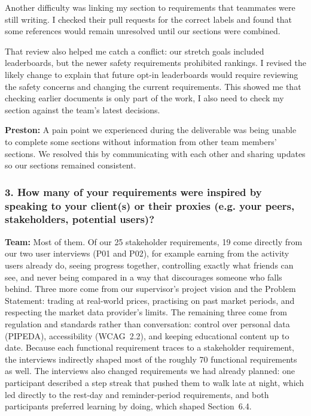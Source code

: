 \documentclass[12pt]{article}
\begin{document}
Another difficulty was linking my section to requirements that teammates were still writing. I checked their pull requests for the correct labels and found that some references would remain unresolved until our sections were combined.

That review also helped me catch a conflict: our stretch goals included leaderboards, but the newer safety requirements prohibited rankings. I revised the likely change to explain that future opt-in leaderboards would require reviewing the safety concerns and changing the current requirements. This showed me that checking earlier documents is only part of the work, I also need to check my section against the team's latest decisions.

\bigskip
\noindent
\textbf{Preston:} A pain point we experienced during the deliverable was being unable to complete some sections without information from other team members’ sections. We resolved this by communicating with each other and sharing updates so our sections remained consistent.


\subsubsection*{3. How many of your requirements were inspired by speaking to
your client(s) or their proxies (e.g. your peers, stakeholders, potential
users)?}

\textbf{Team:} Most of them. Of our 25 stakeholder requirements, 19 come
directly from our two user interviews (P01 and P02), for example earning from
the activity users already do, seeing progress together, controlling exactly
what friends can see, and never being compared in a way that discourages
someone who falls behind. Three more come from our supervisor's project
vision and the Problem Statement: trading at real-world prices, practising on
past market periods, and respecting the market data provider's limits. The
remaining three come from regulation and standards rather than conversation:
control over personal data (PIPEDA), accessibility (WCAG~2.2), and keeping
educational content up to date. Because each functional requirement traces to
a stakeholder requirement, the interviews indirectly shaped most of the
roughly 70 functional requirements as well. The interviews also changed
requirements we had already planned: one participant described a step streak
that pushed them to walk late at night, which led directly to the rest-day and
reminder-period requirements, and both participants preferred learning by
doing, which shaped Section~6.4.
\end{document}
